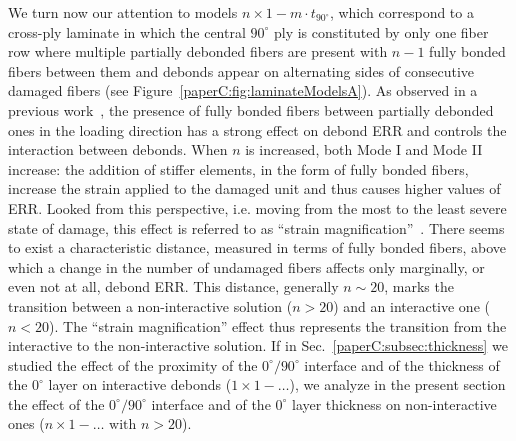 We turn now our attention to models $n\times 1-m\cdot t_{90^{\circ}}$, which correspond to a cross-ply laminate in which the central $90^{\circ}$ ply is constituted by only one fiber row where multiple partially debonded fibers are present with $n-1$ fully bonded fibers between them and debonds appear on alternating sides of consecutive damaged fibers (see Figure~\ref{paperC:fig:laminateModelsA}). %
As observed in a previous work~\cite{DiStasio2019}, the presence of fully bonded fibers between partially debonded ones in the loading direction has a strong effect on debond ERR and controls the interaction between debonds. When $n$ is increased, both Mode I and Mode II increase: the addition of stiffer elements, in the form of fully bonded fibers, increase the strain applied to the damaged unit and thus causes higher values of ERR. Looked from this perspective, i.e. moving from the most to the least severe state of damage, this effect is referred to as ``strain magnification''~\cite{DiStasio2019}. There seems to exist a characteristic distance, measured in terms of fully bonded fibers, above which a change in the number of undamaged fibers affects only marginally, or even not at all, debond ERR. This distance, generally $n\sim20$, marks the transition between a non-interactive solution ($n>20$) and an interactive one ($n<20$). The ``strain magnification'' effect thus represents the transition from the interactive to the non-interactive solution. If in Sec.~\ref{paperC:subsec:thickness} we studied the effect of the proximity of the $0^{\circ}/90^{\circ}$ interface and of the thickness of the $0^{\circ}$ layer on interactive debonds ($1\times 1-\dots$), we analyze in the present section the effect of the $0^{\circ}/90^{\circ}$ interface and of the $0^{\circ}$ layer thickness on non-interactive ones ($n\times 1-\dots\text{ with }n>20$).\\

